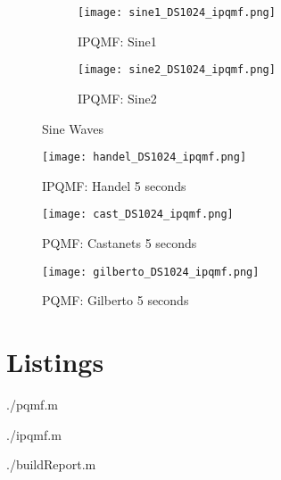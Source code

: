 \documentclass{article} %
\begin{document}
\begin{figure}[H]

\begin{subfigure}{0.5\textwidth}
\centering
\texttt{[image: sine1\_DS1024\_ipqmf.png]}
\caption{IPQMF: Sine1}
\end{subfigure}
\begin{subfigure}{0.5\textwidth}
\centering
\texttt{[image: sine2\_DS1024\_ipqmf.png]}
\caption{IPQMF: Sine2}
\end{subfigure}
\caption{Sine Waves}
\end{figure}
 

\begin{figure}[H]
\centering
\texttt{[image: handel\_DS1024\_ipqmf.png]}
\caption{IPQMF: Handel 5 seconds}
\end{figure}

\begin{figure}[H]
\centering
\texttt{[image: cast\_DS1024\_ipqmf.png]}
\caption{PQMF: Castanets 5 seconds}
\end{figure}


\begin{figure}[H]
\centering
\texttt{[image: gilberto\_DS1024\_ipqmf.png]}
\caption{PQMF: Gilberto 5 seconds}
\end{figure}


\section{Listings}


{./pqmf.m} 


{./ipqmf.m} 


{./buildReport.m} 
\end{document}
